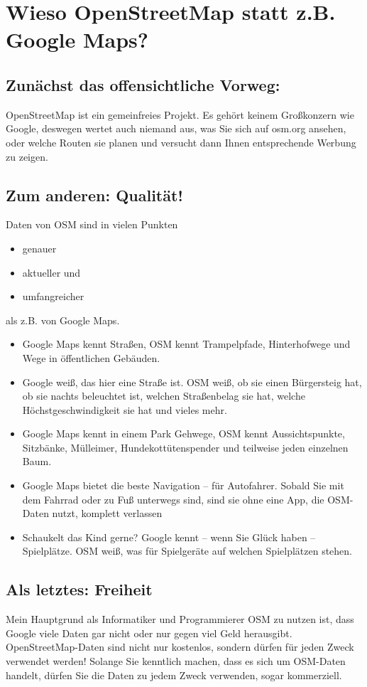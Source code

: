 \documentclass[10pt,foldmark,notumble]{leaflet}
\begin{document}
    \section{Wieso OpenStreetMap statt z.B. Google Maps?}
    \subsection{Zunächst das offensichtliche Vorweg:}
    OpenStreetMap ist ein gemeinfreies Projekt. Es gehört keinem Großkonzern wie Google, deswegen wertet auch niemand aus, was Sie sich auf osm.org ansehen, oder welche Routen sie planen und versucht dann Ihnen entsprechende Werbung zu zeigen.

    \subsection{Zum anderen: Qualität!}
    Daten von OSM sind in vielen Punkten
    \begin{itemize}[noitemsep,topsep=0pt]
        \item genauer
        \item aktueller und
        \item umfangreicher
    \end{itemize}
    als z.B. von Google Maps.

    \begin{itemize}[noitemsep,topsep=0pt]
        \item Google Maps kennt Straßen, OSM kennt Trampelpfade, Hinterhofwege und Wege in öffentlichen Gebäuden.
        \item Google weiß, das hier eine Straße ist. OSM weiß, ob sie einen Bürgersteig hat, ob sie nachts beleuchtet ist, welchen Straßenbelag sie hat, welche Höchstgeschwindigkeit sie hat und vieles mehr.
        \item Google Maps kennt in einem Park Gehwege, OSM kennt Aussichtspunkte, Sitzbänke, Mülleimer, Hundekottütenspender und teilweise jeden einzelnen Baum.
        \item Google Maps bietet die beste Navigation -- für Autofahrer. Sobald Sie mit dem Fahrrad oder zu Fuß unterwegs sind, sind sie ohne eine App, die OSM-Daten nutzt, komplett verlassen
        \item Schaukelt das Kind gerne? Google kennt -- wenn Sie Glück haben -- Spielplätze. OSM weiß, was für Spielgeräte auf welchen Spielplätzen stehen.
    \end{itemize}

    \subsection{Als letztes: Freiheit}
    Mein Hauptgrund als Informatiker und Programmierer OSM zu nutzen ist, dass Google viele Daten gar nicht oder nur gegen viel Geld herausgibt. OpenStreetMap-Daten sind nicht nur kostenlos, sondern dürfen für jeden Zweck verwendet werden! Solange Sie kenntlich machen, dass es sich um OSM-Daten handelt, dürfen Sie die Daten zu jedem Zweck verwenden, sogar kommerziell.
\end{document}
